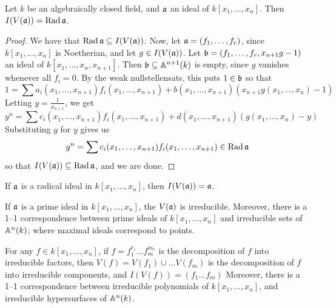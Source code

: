 \begin{theorem}\label{theorem_1.7.2}
    Let $k$ be an algebraically closed field, and  $\af$ an ideal of  $k[x_1,
    \dots, x_n]$. Then $I(V(\af))=\Rad{\af}$.
\end{theorem}
\begin{proof}
    We have that $\Rad{\af} \subseteq I(V(\af))$. Now, let $\af=(f_1, \dots,
    f_r)$, since $k[x_1, \dots, x_n]$ is Noetherian, and let $g \in I(V(\af))$.
    Let $\bf=(f_1, \dots, f_r,x_{n+1}g-1)$ an ideal of $k[x_1, \dots,
    x_n,x_{n+1}]$. Then $\bf \subseteq \A^{n+1}(k)$ is empty, since $g$ vanishes
    whenever all $f_i=0$. By the weak nullstellensats, this puts  $1 \in \bf$ so
    that
    \begin{equation*}
        1=\sum{a_i(x_1, \dots, x_{n+1})f_i(x_1, \dots, x_{n+1})}+b(x_1, \dots,
        x_{n+1})(x_{n+1}g(x_1, \dots, x_n)-1)
    \end{equation*}
    Letting $y=\frac{1}{x_{n+1}}$, we get
    \begin{equation*}
        y^n=\sum{c_i(x_1, \dots, x_{n+1})f_i(x_1, \dots, x_{n+1})}+d(x_1, \dots,
        x_{n+1})(g(x_1, \dots, x_n)-y)
    \end{equation*}
    Substituting $g$ for $y$ gives us
    \begin{equation*}
        g^n=\sum{c_i(x_1, \dots, x_{n+1})f_i(x_1, \dots, x_{n+1})} \in \Rad{\af}
    \end{equation*}
    so that $I(V(\af)) \subseteq \Rad{\af}$, and we are done.
\end{proof}
\begin{corollary}
    If $\af$ is a radical ideal in  $k[x_1, \dots, x_n]$, then $I(V(\af))=\af$.
\end{corollary}
\begin{corollary}
    If $\af$ is a prime ideal in $k[x_1, \dots, x_n]$, the $V(\af)$ is
    irreducible. Moreover, there is a 1--1 correspondence between prime ideals
    of $k[x_1, \dots, x_n]$ and irreducible sets of $\A^n(k)$; where maximal
    ideals correspond to points.
\end{corollary}
\begin{corollary}
    For any $f \in k[x_1, \dots, x_n]$, if $f=f_1^{r_1} \dots f_m^{m_r}$ is the
    decomposition of $f$ into irreducible factors, then  $V(f)=V(f_1) \cup \dots
    V(f_m)$ is the decomposition of $f$ into irreducible components, and
    $I(V(f))=(f_1 \dots f_m)$ Moreover, there is a 1--1 correspondence between irreducible
    polynomials of  $k[x_1, \dots, x_n]$, and irreducible hypersurfaces of
    $\A^n(k)$.
\end{corollary}
